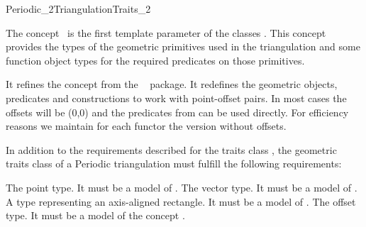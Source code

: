

\begin{ccRefConcept}{Periodic_2TriangulationTraits_2}


\ccDefinition
%
The concept \ccRefName\ is the first template parameter of the classes
.  This concept provides the types of
the geometric primitives used in the triangulation and some function
object types for the required predicates on those primitives.

It refines the concept
 from the \cgal\  package.  It redefines the
geometric objects, predicates and constructions to work with
point-offset pairs. In most cases the offsets will be (0,0) and the
predicates from  can be used
directly. For efficiency reasons we maintain for each functor the
version without offsets.

\ccRefines {}

In addition to the requirements described for the traits class
, the geometric traits class of a
Periodic triangulation must fulfill the following
requirements:

\ccTypes
{}
\ccThreeToTwo
%
 {The point type. It must be a model of
  .}
%
\ccGlue {}
%
\ccGlue {} {The vector type. It must be a model
  of .}
%
\ccGlue {}
%
\ccGlue {} {A type representing an
  axis-aligned rectangle. It must be a model of
  .}
%
\ccGlue {} {The offset type. It must
  be a model of the concept .}


\end{ccRefConcept}
